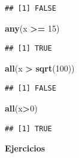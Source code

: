 \documentclass[
]{book}
\newenvironment{Shaded}{\begin{snugshade}}{\end{snugshade}}
\newcommand{\DecValTok}[1]{\textcolor[rgb]{0.00,0.00,0.81}{#1}}
\newcommand{\FunctionTok}[1]{\textcolor[rgb]{0.13,0.29,0.53}{\textbf{#1}}}
\newcommand{\NormalTok}[1]{#1}
\newcommand{\SpecialCharTok}[1]{\textcolor[rgb]{0.81,0.36,0.00}{\textbf{#1}}}
\begin{document}
\begin{verbatim}
## [1] FALSE
\end{verbatim}

\begin{Shaded}
\begin{Highlighting}[]
\FunctionTok{any}\NormalTok{(x }\SpecialCharTok{\textgreater{}=} \DecValTok{15}\NormalTok{)}
\end{Highlighting}
\end{Shaded}

\begin{verbatim}
## [1] TRUE
\end{verbatim}

\begin{Shaded}
\begin{Highlighting}[]
\FunctionTok{all}\NormalTok{(x }\SpecialCharTok{\textgreater{}} \FunctionTok{sqrt}\NormalTok{(}\DecValTok{100}\NormalTok{))}
\end{Highlighting}
\end{Shaded}

\begin{verbatim}
## [1] FALSE
\end{verbatim}

\begin{Shaded}
\begin{Highlighting}[]
\FunctionTok{all}\NormalTok{(x}\SpecialCharTok{\textgreater{}}\DecValTok{0}\NormalTok{)}
\end{Highlighting}
\end{Shaded}

\begin{verbatim}
## [1] TRUE
\end{verbatim}

\textbf{Ejercicios}
\end{document}
